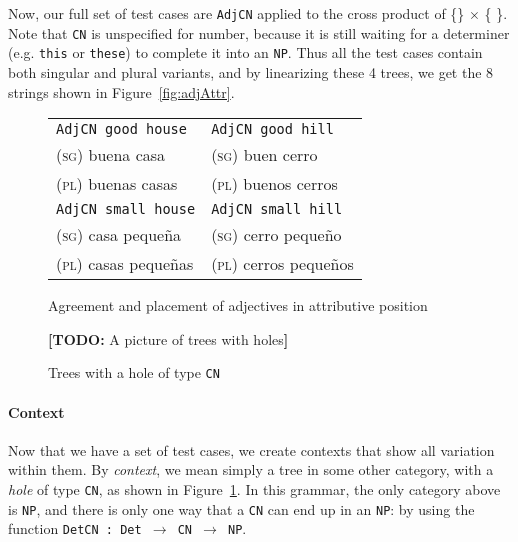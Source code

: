 \documentclass[11pt]{article}
\def\t#1{\texttt{#1}}
\newcommand{\todo}[1]{{\color{cyan}\textbf{[TODO: }#1\textbf{]}}}
\begin{document}
Now, our full set of test cases are \t{AdjCN} applied to the cross
product of \{\}
$\times$ \{ \}.
Note that \t{CN} is unspecified for number, because it is still waiting for a
determiner (e.g. \t{this} or \t{these}) to complete it into an
\t{NP}. Thus all the test cases contain both singular and plural
variants, and by linearizing these 4 trees, we get the 8 strings shown
in Figure~\ref{fig:adjAttr}.

\begin{figure}
\centering
\begin{minipage}{.5\textwidth}
\centering
\begin{tabular}{| l | l |}
\hline
\t{AdjCN good house}   & \t{AdjCN good hill} \\ 
\textsc{(sg)} buena casa             & \textsc{(sg)} buen cerro \\
\textsc{(pl)} buenas casas           & \textsc{(pl)} buenos cerros \\ \hline

\t{AdjCN small house}   & \t{AdjCN small hill} \\ 
\textsc{(sg)} casa  peque\~{n}a            & \textsc{(sg)} cerro  peque\~{n}o \\
\textsc{(pl)} casas  peque\~{n}as          & \textsc{(pl)} cerros  peque\~{n}os \\ \hline
\end{tabular}
\caption{Agreement and placement of adjectives in attributive position}
\label{fig:adjAttr}
\end{minipage}%
\begin{minipage}{.5\textwidth}
  \centering
  \todo{A picture of trees with holes}
 \caption{Trees with a hole of type \t{CN}}
\label{fig:treesWithHoles}
\end{minipage}
\end{figure}


\paragraph{Context} 

Now that we have a set of test cases, we create contexts that show all
variation within them. By \emph{context}, we mean simply a tree in
some other category, with a \emph{hole} of type \t{CN}, as shown in
Figure~\ref{fig:treesWithHoles}. 
In this grammar, the only category above is \t{NP}, and there is only
one way that a \t{CN} can end up in an \t{NP}: by using the function
\t{DetCN : Det $\rightarrow$ CN $\rightarrow$ NP}. 
\end{document}

